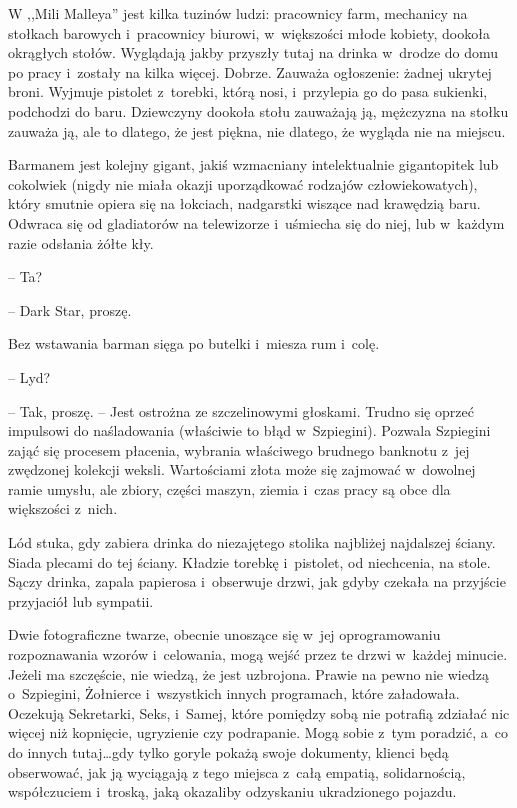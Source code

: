 \documentclass[oneside,polish,11pt,sfheadings]{mwbk}
\begin{document}
W ,,Mili Malleya'' jest kilka tuzinów ludzi: pracownicy farm, mechanicy na
stołkach barowych i~pracownicy biurowi, w~większości młode kobiety,
dookoła okrągłych stołów. Wyglądają jakby przyszły tutaj na drinka w~drodze do domu po pracy i~zostały na kilka więcej. Dobrze. Zauważa
ogłoszenie: żadnej ukrytej broni. Wyjmuje pistolet z~torebki, którą
nosi, i~przylepia go do pasa sukienki, podchodzi do baru. Dziewczyny
dookoła stołu zauważają ją, mężczyzna na stołku zauważa ją, ale to
dlatego, że jest piękna, nie dlatego, że wygląda nie na miejscu.

Barmanem jest kolejny gigant, jakiś wzmacniany intelektualnie
gigantopitek lub cokolwiek (nigdy nie miała okazji uporządkować rodzajów
człowiekowatych), który smutnie opiera się na łokciach, nadgarstki
wiszące nad krawędzią baru. Odwraca się od gladiatorów na telewizorze i~uśmiecha się do niej, lub w~każdym razie odsłania żółte kły.

-- Ta?

-- Dark Star, proszę.

Bez wstawania barman sięga po butelki i~miesza rum i~colę.

-- Lyd?

-- Tak, proszę. -- Jest ostrożna ze szczelinowymi głoskami. Trudno się
oprzeć impulsowi do naśladowania (właściwie to błąd w~Szpiegini).
Pozwala Szpiegini zająć się procesem płacenia, wybrania właściwego
brudnego banknotu z~jej zwędzonej kolekcji weksli. Wartościami złota
może się zajmować w~dowolnej ramie umysłu, ale zbiory, części maszyn,
ziemia i~czas pracy są obce dla większości z~nich.

Lód stuka, gdy zabiera drinka do niezajętego stolika najbliżej
najdalszej ściany. Siada plecami do tej ściany. Kładzie torebkę i~pistolet, od niechcenia, na stole. Sączy drinka, zapala papierosa i~obserwuje drzwi, jak gdyby czekała na przyjście przyjaciół lub sympatii.

Dwie fotograficzne twarze, obecnie unoszące się w~jej oprogramowaniu
rozpoznawania wzorów i~celowania, mogą wejść przez te drzwi w~każdej
minucie. Jeżeli ma szczęście, nie wiedzą, że jest uzbrojona. Prawie na
pewno nie wiedzą o~Szpiegini, Żołnierce i~wszystkich innych programach,
które załadowała. Oczekują Sekretarki, Seks, i~Samej, które pomiędzy
sobą nie potrafią zdziałać nic więcej niż kopnięcie, ugryzienie czy
podrapanie. Mogą sobie z~tym poradzić, a~co do innych tutaj\ldots gdy tylko
goryle pokażą swoje dokumenty, klienci będą obserwować, jak ją wyciągają
z tego miejsca z~całą empatią, solidarnością, współczuciem i~troską,
jaką okazaliby odzyskaniu ukradzionego pojazdu.
\end{document}
